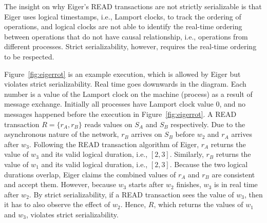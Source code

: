 The insight on why Eiger's \textsc{READ} transactions are not strictly serializable is that Eiger uses logical timestamps, i.e., Lamport clocks, to track the ordering of operations, and logical clocks are not able to identify the real-time ordering between operations that do not have causal relationship, i.e., operations from different processes. Strict serializability, however, requires the real-time ordering to be respected.

Figure~\ref{fig:eigerrot} is an example execution, which is allowed by Eiger but violates strict serializability. 
Real time goes downwards in the diagram. Each number is a value of the Lamport clock on the machine (process) as a result of message exchange. Initially all processes have Lamport clock value $0$, and no messages happened before the execution in Figure~\ref{fig:eigerrot}. A \textsc{READ} transaction $R=\{r_A, r_B\}$ reads values on $S_A$ and $S_B$ respectively. Due to the asynchronous nature of the network, $r_B$ arrives on $S_B$ before $w_2$ and $r_A$ arrives after $w_3$. Following the \textsc{READ} transaction algorithm of Eiger, $r_A$ returns the value of $w_3$ and its valid logical duration, i.e., $[2,3]$. Similarly, $r_B$ returns the value of $w_1$ and its valid logical duration, i.e., $[2,3]$. Because the two logical durations overlap, Eiger claims the combined values of $r_A$ and $r_B$ are consistent and accept them. However, because $w_3$ starts after $w_2$ finishes, $w_3$ is in real time after $w_2$. By strict serializability, if a \textsc{READ} transaction sees the value of $w_3$, then it has to also observe the effect of $w_2$. Hence, $R$, which returns the values of $w_1$ and $w_3$, violates strict serializability.

